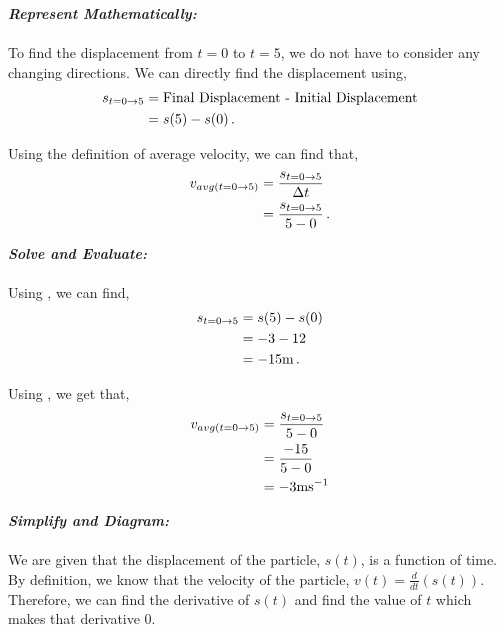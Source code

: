 \begin{subquestions}
\begin{subsubquestions}
\begin{subsubsubquestions}
			
			
			\textbf{\textit{Represent Mathematically:}} \\ \\
			To find the displacement from $t=0$ to $t=5$, we do not have to consider any changing directions. We can directly find the displacement using,
			\begin{align}
				s_{t=0 \rightarrow 5} & = \text{Final Displacement - Initial Displacement} \nonumber \\
				& =  s(5)-s(0) \,. \label{2014:q5*:Seqn4} 
			\end{align}
			
			Using the definition of average velocity, we can find that,
			\begin{align}
				v_{avg(t=0 \rightarrow 5)} & = \frac{s_{t=0 \rightarrow 5}}{\Delta t} \nonumber \\
				& = \frac{s_{t=0 \rightarrow 5}}{5-0} \,. \label{2014:q5*:Seqn5}
			\end{align}
			
			
			
			\textbf{\textit{Solve and Evaluate:}} \\ \\
			Using , we can find,
			\begin{align}
				s_{t=0 \rightarrow 5} & =  s(5)-s(0) \nonumber \\
				& = -3 - 12 \nonumber \\
				& = -15 \text{m} \,.
			\end{align}
			
			Using , we get that,
			\begin{align}
				v_{avg(t=0 \rightarrow 5)} & =\frac{s_{t=0 \rightarrow 5}}{5-0} \nonumber \\
				& = \frac{-15}{5-0} \nonumber \\
				& = -3 \text{ms}^{-1} 
			\end{align}
			
			
			\subsubsubquestion
			
			\textbf{\textit{Simplify and Diagram:}} \\ \\
			We are given that the displacement of the particle, $s(t)$, is a function of time. By definition, we know that the velocity of the particle, $v(t)=\frac{d}{dt}(s(t))$. Therefore, we can find the derivative of $s(t)$ and find the value of $t$ which makes that derivative 0.
			

\end{subsubsubquestions}
\end{subsubquestions}
\end{subquestions}
